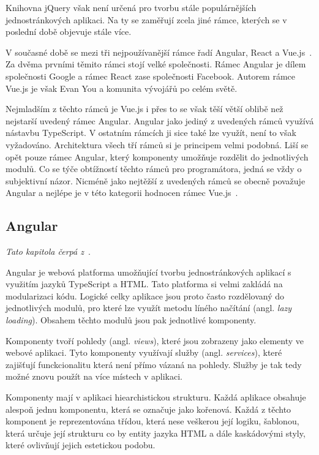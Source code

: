 Knihovna jQuery však není určená pro tvorbu stále populárnějších jednostránkových aplikaci. Na ty se zaměřují zcela jiné rámce, kterých se v poslední době objevuje stále více.

V současné době se mezi tři nejpoužívanější rámce řadí Angular, React a Vue.js~\cite{bib:js-framework}. Za dvěma prvními těmito rámci stojí velké společnosti. Rámec Angular je dílem společnosti Google a rámec React zase společnosti Facebook. Autorem rámce Vue.js je však Evan You a komunita vývojářů po celém světě.

Nejmladším z těchto rámců je Vue.js i přes to se však těší větší oblibě než nejstarší uvedený rámec Angular. Angular jako jediný z uvedených rámců využívá nástavbu TypeScript. V ostatním rámcích ji sice také lze využít, není to však vyžadováno. Architektura všech tří rámců si je principem velmi podobná. Liší se opět pouze rámec Angular, který komponenty umožňuje rozdělit do jednotlivých modulů. Co se týče obtížností těchto rámců pro programátora, jedná se vždy o subjektivní názor. Nicméně jako nejtěžší z uvedených rámců se obecně považuje Angular a nejlépe je v této kategorii hodnocen rámec Vue.js~\cite{bib:angular-vs-react-vs-vue}.



\subsection{Angular}
\emph{Tato kapitola čerpá z~\cite{bib:ng-arch}}.

Angular je webová platforma umožňující tvorbu jednostránkových aplikací s využitím jazyků TypeScript a HTML. Tato platforma si velmi zakládá na modularizaci kódu. Logické celky aplikace jsou proto často rozdělovaný do jednotlivých modulů, pro které lze využít metodu líného načítání (angl. \emph{lazy loading}). Obsahem těchto modulů jsou pak jednotlivé komponenty. 

Komponenty tvoří pohledy (angl. \emph{views}), které jsou zobrazeny jako elementy ve webové aplikaci. Tyto komponenty využívají služby (angl. \emph{services}), které zajišťují funckcionalitu která není přímo vázaná na pohledy. Služby je tak tedy možné znovu použít na více místech v aplikaci.

Komponenty mají v aplikaci hiearchistickou strukturu. Každá aplikace obsahuje alespoň jednu komponentu, která se označuje jako kořenová. Každá z těchto komponent je reprezentována třídou, která nese veškerou její logiku, šablonou, která určuje její strukturu co by entity jazyka HTML a dále kaskádovými styly, které ovlivňují jejich estetickou podobu.

